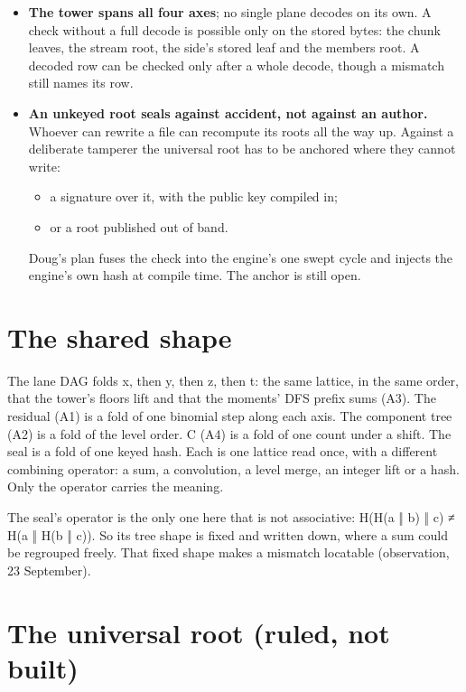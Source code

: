 \begin{itemize}
\item \textbf{The tower spans all four axes}; no single plane decodes on its own. A check without a full decode is possible only on the stored bytes: the chunk leaves, the stream root, the side's stored leaf and the members root. A decoded row can be checked only after a whole decode, though a mismatch still names its row.
\item \textbf{An unkeyed root seals against accident, not against an author.} Whoever can rewrite a file can recompute its roots all the way up. Against a deliberate tamperer the universal root has to be anchored where they cannot write:

\begin{itemize}
\item a signature over it, with the public key compiled in;
\item or a root published out of band.
\end{itemize}

Doug's plan fuses the check into the engine's one swept cycle and injects the engine's own hash at compile time. The anchor is still open.
\end{itemize}

\section{\texorpdfstring{The shared shape}{The shared shape}}

The lane DAG folds x, then y, then z, then t: the same lattice, in the same order, that the tower's floors lift and that the moments' DFS prefix sums (A3). The residual (A1) is a fold of one binomial step along each axis. The component tree (A2) is a fold of the level order. C (A4) is a fold of one count under a shift. The seal is a fold of one keyed hash. Each is one lattice read once, with a different combining operator: a sum, a convolution, a level merge, an integer lift or a hash. Only the operator carries the meaning.

The seal's operator is the only one here that is not associative: H(H(a ‖ b) ‖ c) ≠ H(a ‖ H(b ‖ c)). So its tree shape is fixed and written down, where a sum could be regrouped freely. That fixed shape makes a mismatch locatable (observation, 23 September).

\section{\texorpdfstring{The universal root (ruled, not built)}{The universal root (ruled, not built)}}

